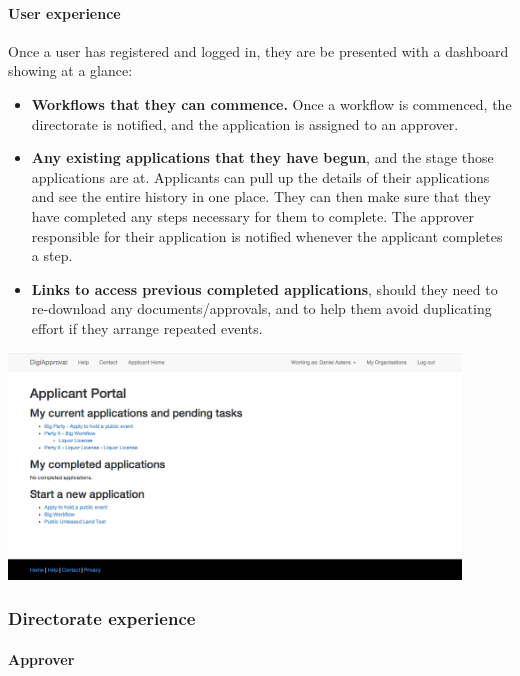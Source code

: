 \documentclass[12pt,a4paper,twosided]{article}
\begin{document}
\paragraph{User experience}

Once a user has registered and logged in, they are be presented with a
dashboard showing at a glance:

\begin{itemize}

\item
  \textbf{Workflows that they can commence.} Once a workflow is
  commenced, the directorate is notified, and the application is
  assigned to an approver.
\item
  \textbf{Any existing applications that they have begun}, and the stage
  those applications are at. Applicants can pull up the details of their
  applications and see the entire history in one place. They can then
  make sure that they have completed any steps necessary for them to
  complete. The approver responsible for their application is notified
  whenever the applicant completes a step.
\item
  \textbf{Links to access previous completed applications}, should they
  need to re-download any documents/approvals, and to help them avoid
  duplicating effort if they arrange repeated events.
\end{itemize}

\includegraphics[width=0.9\textwidth]{customer-portal.png}

\subsubsection{Directorate experience}

\paragraph{Approver}
\end{document}
